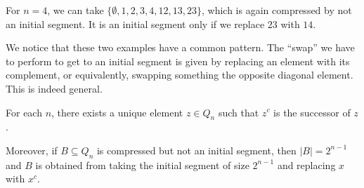 \documentclass[a4paper]{article}
\begin{document}
For $n = 4$, we can take $\{\emptyset, 1, 2, 3, 4, 12, 13, 23\}$, which is again compressed by not an initial segment. It is an initial segment only if we replace $23$ with $14$.
\begin{center}
\end{center}
We notice that these two examples have a common pattern. The ``swap'' we have to perform to get to an initial segment is given by replacing an element with its complement, or equivalently, swapping something the opposite diagonal element. This is indeed general.
\begin{lemma}
  For each $n$, there exists a unique element $z \in Q_n$ such that $z^c$ is the successor of $z$.

  Moreover, if $B \subseteq Q_n$ is compressed but not an initial segment, then $|B| = 2^{n - 1}$ and $B$ is obtained from taking the initial segment of size $2^{n - 1}$ and replacing $x$ with $x^c$.
\end{lemma}
\end{document}
